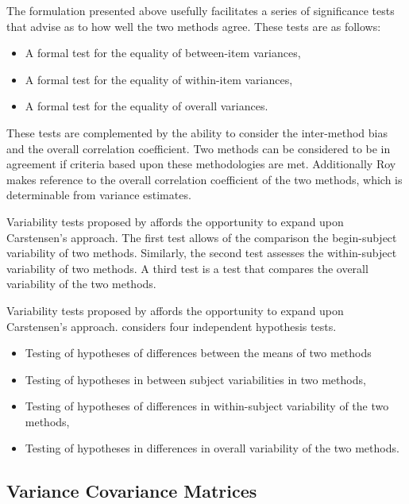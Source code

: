 \documentclass[12pt, a4paper]{article}
\theoremstyle{plain}
\theoremstyle{definition}
\theoremstyle{remark}
\begin{document}
The formulation presented above usefully facilitates a series of significance tests that advise as to how well the two methods
agree. These tests are as follows:
\begin{itemize}
	\item A formal test for the equality of between-item variances,
	\item A formal test for the equality of within-item variances,
	\item A formal test for the equality of overall variances.
\end{itemize}
	These tests are complemented by the ability to consider the inter-method bias and the overall correlation coefficient. Two methods can be considered to be in agreement if criteria based upon these methodologies are met. Additionally Roy makes reference to the overall correlation coefficient of the two methods, which is determinable from variance estimates.

Variability tests proposed by \citet{Roy2009} affords the opportunity to expand upon Carstensen's approach.
The first test allows of the comparison the begin-subject variability of two methods. Similarly, the second test
assesses the within-subject variability of two methods. A third test is a test that compares the overall variability of the two methods.


	Variability tests proposed by \citet{ARoy2009} affords the opportunity to expand upon Carstensen's approach. \citet{ARoy2009} considers four independent hypothesis tests.
		\begin{itemize}
			\item Testing of hypotheses of differences between the means of
			two methods\item Testing of hypotheses in between subject
			variabilities in two methods, \item Testing of hypotheses of
			differences in within-subject variability of the two methods,
			\item Testing of hypotheses in differences in overall variability
			of the two methods.
		\end{itemize}

	
	
	\newpage
	\subsection{Variance Covariance Matrices }
	
\end{document}
